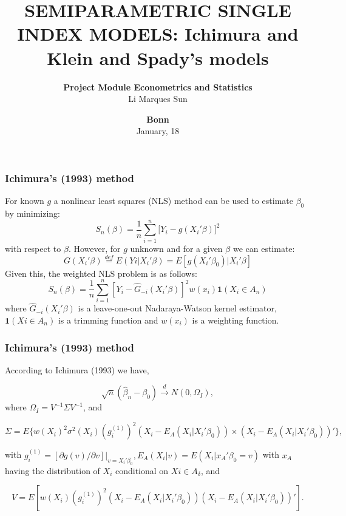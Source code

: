 \documentclass[11pt]{beamer}
\begin{document}
\title{SEMIPARAMETRIC SINGLE INDEX MODELS: Ichimura and Klein and Spady's models}

\author[Li Marques Sun] %
{
{\bf Project Module Econometrics and Statistics}\\
{\small Li Marques Sun}\\[1ex]
}

\date{
{\bf Bonn}\\
{\small January, 18}
}


\begin{frame}
    \titlepage
    \note{~}
\end{frame}


\begin{frame}[t]
    \frametitle{Ichimura's (1993) method}
For known $g$ a nonlinear least squares (NLS) method can be used to estimate $\beta_0$ by minimizing:
\begin{equation}
S_n(\beta) = \frac{1}{n}\sum_{i = 1}^n\big[Y_i - g(X_i'\beta)\big]^2
\end{equation}
with respect to $\beta$. However, for $g$ unknown and for a given $\beta$ we can estimate:
\begin{equation}
G(X_i'\beta) \stackrel{def}{=} E(Yi|X_i'\beta) = E[g(X_i'\beta_0)|X_i'\beta]
\end{equation}
Given this, the weighted NLS problem is as follows:
\begin{equation}
S_n(\beta) = \frac{1}{n} \sum_{i=1}^{n}  [Y_i - \hat{G}_{-i}(X_i'\beta)]^2w(x_i)\mathbf{1}{(X_i \in A_n)}
\end{equation}
where $\hat{G}_{-i}(X_i'\beta)$ is a leave-one-out Nadaraya-Watson kernel estimator,  $\mathbf{1}{(Xi \in A_n)}$ is a trimming function and $w(x_i)$ is a weighting function.

\end{frame}



\begin{frame}[t]
    \frametitle{Ichimura's (1993) method}
    
\begin{theorem}
According to Ichimura (1993) we have,



\[ \sqrt{n}(\hat{\beta}_n - \beta_0) \stackrel{d}{\rightarrow} N(0,\Omega_I), \] where $\Omega_I = V^{-1}\Sigma V^{-1}$, and

\[\Sigma = E\{w(X_i)^2\sigma^2(X_i)(g_i^{(1)})^2(X_i - E_A(X_i|X_i'\beta_0)) \times (X_i - E_A(X_i|X_i'\beta_0))'\},\]

with $g_i^{(1)} = [\partial g(v)/\partial v]|_{v = X_i'\beta_0}, E_A(X_i|v) = E(X_i|x_A'\beta_0 = v)$ with $x_A$ having the distribution of $X_i$ conditional on $Xi \in A_\delta$, and

\[ V = E[w(X_i)(g_i^{(1)})^2(X_i - E_A(X_i|X_i'\beta_0))(X_i - E_A(X_i|X_i'\beta_0))'].\]

\end{theorem}
\end{frame}
\end{document}

